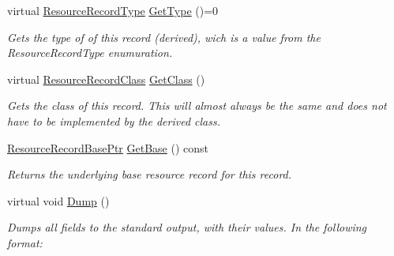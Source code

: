 \begin{DoxyCompactItemize}
virtual \hyperlink{namespace_senergy_1_1_dns_a590bfd748c955364770f5ce358d9dfe0}{Resource\-Record\-Type} \hyperlink{class_senergy_1_1_dns_1_1_resource_record_interface_af895ba199749599d42f8e6a737eb9118}{Get\-Type} ()=0
\begin{DoxyCompactList}\small\item\em Gets the type of of this record (derived), wich is a value from the Resource\-Record\-Type enumuration. \end{DoxyCompactList}\item 
virtual \hyperlink{namespace_senergy_1_1_dns_a953f153bc411213d621d00c1e1b3eb9d}{Resource\-Record\-Class} \hyperlink{class_senergy_1_1_dns_1_1_resource_record_interface_a4332e80632928d846abe9a58f912c217}{Get\-Class} ()
\begin{DoxyCompactList}\small\item\em Gets the class of this record. This will almost always be the same and does not have to be implemented by the derived class. \end{DoxyCompactList}\item 
\hyperlink{namespace_senergy_1_1_dns_a72915c893fbf242018e79d8f92e1646b}{Resource\-Record\-Base\-Ptr} \hyperlink{class_senergy_1_1_dns_1_1_resource_record_interface_a6f603d9d3ffe34e4376ea8b27fd0c72d}{Get\-Base} () const 
\begin{DoxyCompactList}\small\item\em Returns the underlying base resource record for this record. \end{DoxyCompactList}\item 
virtual void \hyperlink{class_senergy_1_1_dns_1_1_resource_record_interface_aced6e4bc388ce3568d72d9670a2e9da5}{Dump} ()
\begin{DoxyCompactList}\small\item\em Dumps all fields to the standard output, with their values. In the following format\-: \end{DoxyCompactList}\end{DoxyCompactItemize}
